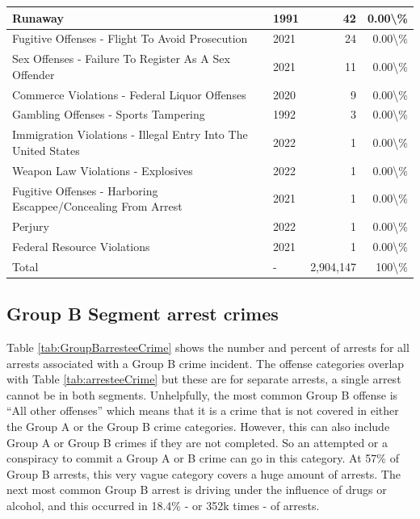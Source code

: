 \documentclass[
]{krantz}
\begin{document}
\begin{longtable}[t]{l|l|r|r}
\hline
Runaway & 1991 & 42 & 0.00\textbackslash{}\%\\
\hline
Fugitive Offenses - Flight To Avoid Prosecution & 2021 & 24 & 0.00\textbackslash{}\%\\
\hline
Sex Offenses - Failure To Register As A Sex Offender & 2021 & 11 & 0.00\textbackslash{}\%\\
\hline
Commerce Violations - Federal Liquor Offenses & 2020 & 9 & 0.00\textbackslash{}\%\\
\hline
Gambling Offenses - Sports Tampering & 1992 & 3 & 0.00\textbackslash{}\%\\
\hline
Immigration Violations - Illegal Entry Into The United States & 2022 & 1 & 0.00\textbackslash{}\%\\
\hline
Weapon Law Violations - Explosives & 2022 & 1 & 0.00\textbackslash{}\%\\
\hline
Fugitive Offenses - Harboring Escappee/Concealing From Arrest & 2021 & 1 & 0.00\textbackslash{}\%\\
\hline
Perjury & 2022 & 1 & 0.00\textbackslash{}\%\\
\hline
Federal Resource Violations & 2021 & 1 & 0.00\textbackslash{}\%\\
\hline
Total & - & 2,904,147 & 100\textbackslash{}\%\\
\hline
\end{longtable}

\subsection{Group B Segment arrest
crimes}\label{group-b-segment-arrest-crimes}

Table \ref{tab:GroupBarresteeCrime} shows the number and
percent of arrests for all arrests associated with a Group B
crime incident. The offense categories overlap with Table
\ref{tab:arresteeCrime} but these are for separate arrests,
a single arrest cannot be in both segments. Unhelpfully, the
most common Group B offense is ``All other offenses'' which
means that it is a crime that is not covered in either the
Group A or the Group B crime categories. However, this can
also include Group A or Group B crimes if they are not
completed. So an attempted or a conspiracy to commit a Group
A or B crime can go in this category. At 57\% of Group B
arrests, this very vague category covers a huge amount of
arrests. The next most common Group B arrest is driving
under the influence of drugs or alcohol, and this occurred
in 18.4\% - or 352k times - of arrests.
\end{document}
